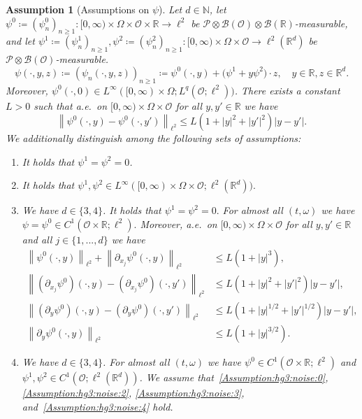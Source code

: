 \documentclass[reqno]{amsart}
\newtheorem{assumption}[Satz]{Assumption}
\newcommand{\N}{\mathbb{N}}
\newcommand{\R}{\mathbb{R}}
\newcommand{\sP}{\mathscr{P}}
\newcommand{\sB}{\mathscr{B}}
\newcommand{\sO}{\mathscr{O}}
\newcommand{\ce}{\coloneqq}
\newcommand{\1}{\mathbf{1}}
\newcommand{\nrm}[1]{\left\lVert #1 \right\rVert}
\begin{document}
	\begin{assumption}[Assumptions on $\psi$]\label{Assumption:noise}
Let $d\in \N$, let $\psi^0\ce (\psi^0_n)_{n\ge 1}\colon [0,\infty) \times\Omega\times\sO\times \R\to \ell^2$ be $\mathscr{P}\otimes\mathscr{B}(\sO)\otimes \sB(\R)$-measurable, and let $\psi^1\ce (\psi^1_n)_{n\ge 1}, \psi^2\ce (\psi^2_n)_{n\ge 1}\colon [0,\infty)\times\Omega\times\sO \to \ell^2(\R^d)$ be $\sP\otimes \sB(\sO)$-measurable. 
\begin{equation}
    \psi(\cdot, y,z)\ce(\psi_n(\cdot,y,z))_{n\ge 1}\ce \psi^0(\cdot, y)+\big( \psi^1+ y\psi^2\big)\cdot z, \quad y\in \R, z\in \R^d.
\end{equation}
Moreover, $\psi^0(\cdot,0)\in L^\infty([0,\infty)\times\Omega;L^q(\sO;\ell^2))$. There exists a constant $L>0$ such that a.e.\ on $[0,\infty)\times\Omega\times\sO$ for all $y,y'\in \R$ we have 
            \begin{equation}\label{eq:assumption:hg0:noise}
                \nrm{\psi^0(\cdot,y)-\psi^0(\cdot,y')}_{\ell^2}\le L(1+|y|^2+|y'|^2)|y-y'|.
            \end{equation}
            We additionally distinguish among the following sets of assumptions:
\begin{enumerate}
			\item\label{assumption:hg1} 
            It holds that $\psi^1=\psi^2=0$.
            \item\label{assumption:hg2} It holds that $\psi^1, \psi^2 \in L^\infty([0,\infty)\times\Omega\times\sO;\ell^2(\R^d)).$
            \item\label{assumption:hg3}  
            We have $d\in\{3,4\}$. It holds that $\psi^1=\psi^2=0.$
            For almost all $(t,\omega)$ we have $\psi=\psi^0\in C^1(\sO\times \R;\ell^2).$ 
            Moreover, a.e.\ on $[0,\infty)\times\Omega\times\sO$ for all $y,y'\in \R$ and all $j\in\{1,...,d\}$ we have  
             \begin{align}
             \nrm{\psi^0(\cdot,y)}_{\ell^2}+ \nrm{\partial_{x_j}\psi^0(\cdot, y)}_{\ell^2}&\le L(1+|y|^3),\label{Assumption:hg3:noise:0}\\
                \nrm{(\partial_{x_j}\psi^0)(\cdot,y)-(\partial_{x_j}\psi^0)(\cdot,y')}_{\ell^2}&\le L  (1+|y|^2+|y'|^2)|y-y'|,\label{Assumption:hg3:noise:2}\\
                \nrm{(\partial_y\psi^0)(\cdot,y)-(\partial_y\psi^0)(\cdot,y')}_{\ell^2}&\le L  (1+|y|^{1/2}+|y'|^{1/2})|y-y'|,\label{Assumption:hg3:noise:3}\\
                \nrm{\partial_y\psi^0(\cdot,y)}_{\ell^2}&\le L(1+|y|^{3/2})\label{Assumption:hg3:noise:4}.
             \end{align}
    \item\label{assumption:hg4}
    We have $d\in \{3,4\}$. 
    For almost all $(t,\omega)$ we have $\psi^0\in C^1(\sO\times \R;\ell^2)$  
            and $ \psi^1,\psi^2\in C^1(\sO;\ell^2(\R^d))$. We assume that~\eqref{Assumption:hg3:noise:0}, \eqref{Assumption:hg3:noise:2}, \eqref{Assumption:hg3:noise:3}, and~\eqref{Assumption:hg3:noise:4} hold. 
		\end{enumerate}
	\end{assumption}
\end{document}
